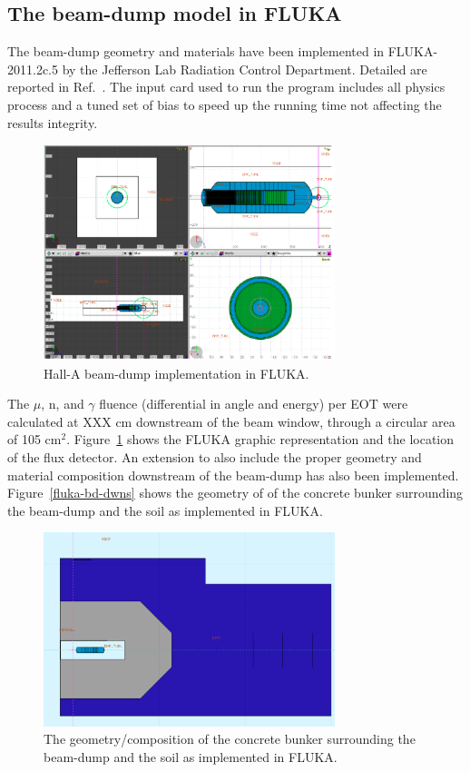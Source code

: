 \subsection{The beam-dump model in FLUKA}
The beam-dump geometry and  materials have  been implemented in FLUKA-2011.2c.5 by the Jefferson Lab Radiation Control Department. Detailed are reported in Ref.~\cite{jnote-bd}.  The input card used to run the program  includes all physics process and a tuned set of bias to speed up the running time not affecting the results integrity. 
\begin{figure}[h!] 
\center
\includegraphics[width=8.5cm]{figs/fluka-bd.pdf}
\caption{Hall-A beam-dump implementation in FLUKA. }
\label{fig:fluka-bd}
\end{figure}
The $\mu$, n, and $\gamma$ fluence (differential in angle and energy) per EOT were  calculated   at XXX cm  downstream of the beam window, through a circular area of 105 cm$^2$. Figure~\ref{fig:fluka-bd} shows the FLUKA graphic representation and the location of the flux detector.
An extension to also include the proper geometry and material composition downstream of the beam-dump has also been implemented.
Figure~\ref{fluka-bd-dwns}  shows the geometry of of the concrete bunker surrounding the beam-dump and  the soil as implemented in FLUKA.

\begin{figure}[h!] 
\center
\includegraphics[width=8.5cm]{figs/fluka-bd-dwns.pdf}
\caption{The geometry/composition  of the concrete bunker surrounding the beam-dump and  the soil as implemented in FLUKA.}
\label{fig:fluka-bd-dwns}
\end{figure}


